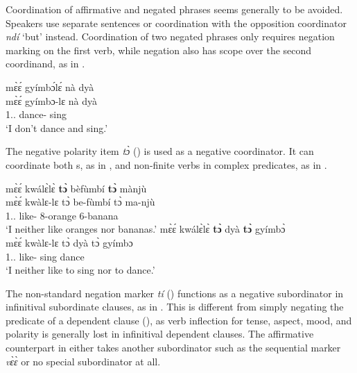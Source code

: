 \documentclass[output=paper,colorlinks=true, citecolor=brown,draftmode]{langscibook}
\begin{document}
Coordination of affirmative and negated phrases seems generally to be avoided. Speakers use separate sentences or coordination with the opposition coordinator {\itshape ndí} `but' instead. Coordination of two negated phrases only requires negation marking on the first verb, while negation also has scope over the second coordinand, as in .

\ea\label{NCord} 
\glll mɛ̀ɛ́ gyímbɔ́lɛ́ nà dyà\\
mɛ̀ɛ́ gyímbɔ-lɛ nà dyà\\
1{\SG}.{\NEG}.{\PRS} dance-{\NEG} {\CONJ} sing\\
\trans `I don't dance and sing.'
\z

The negative polarity item {\itshape tɔ̀} () is used as a negative coordinator. It can coordinate both {\NP}s, as in , and non-finite verbs in complex predicates, as in .

\ea\label{negcoord} 
\ea\label{negcoord1} 
  \glll mɛ̀ɛ́ kwálɛ̀lɛ̀ {\bfseries tɔ̀} bèfùmbí {\bfseries tɔ̀} mànjù\\
  mɛ̀ɛ́ kwàlɛ-lɛ tɔ̀ be-fùmbí tɔ̀ ma-njù\\
  1{\SG}.{\NEG}.{\PRS} like-{\NEG} {\NPI} 8-orange {\NPI} 6-banana\\ 
     \trans `I neither like oranges nor bananas.'
\ex\label{negcoord2} 
  \glll mɛ̀ɛ́ kwálɛ̀lɛ̀ {\bfseries tɔ̀} dyà {\bfseries tɔ̀} gyímbɔ̀\\
  mɛ̀ɛ́ kwàlɛ-lɛ tɔ̀ dyà tɔ̀ gyímbɔ\\
  1{\SG}.{\NEG}.{\PRS} like-{\NEG} {\NPI} sing {\NPI} dance\\ 
     \trans `I neither like to sing nor to dance.'
\z    
\z

The non-standard negation marker {\itshape tí} ()  functions as a negative subordinator in infinitival subordinate clauses, as in . This is different from simply negating the predicate of a dependent clause (), as verb inflection for tense, aspect, mood, and polarity is generally lost in infinitival dependent clauses.  The affirmative counterpart in  either takes another subordinator such as the sequential marker {\itshape vɛ̀ɛ̀} or no special subordinator at all.
\end{document}
